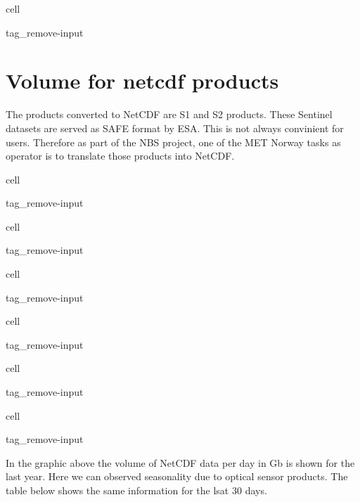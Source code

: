 \documentclass[letterpaper,10pt,english]{jupyterBook}
\begin{document}
\begin{sphinxuseclass}{cell}
\begin{sphinxuseclass}{tag_remove-input}
\end{sphinxuseclass}
\end{sphinxuseclass}

\section{Volume for netcdf products}
\label{\detokenize{volumes:volume-for-netcdf-products}}
\sphinxAtStartPar
The products converted to NetCDF are S1 and S2 products. These Sentinel datasets are served as SAFE format by ESA. This is not always convinient for users. Therefore as part of the NBS project, one of the MET Norway tasks as operator is to translate those products into NetCDF.

\begin{sphinxuseclass}{cell}
\begin{sphinxuseclass}{tag_remove-input}
\end{sphinxuseclass}
\end{sphinxuseclass}
\begin{sphinxuseclass}{cell}
\begin{sphinxuseclass}{tag_remove-input}
\end{sphinxuseclass}
\end{sphinxuseclass}
\begin{sphinxuseclass}{cell}
\begin{sphinxuseclass}{tag_remove-input}
\end{sphinxuseclass}
\end{sphinxuseclass}
\begin{sphinxuseclass}{cell}
\begin{sphinxuseclass}{tag_remove-input}
\end{sphinxuseclass}
\end{sphinxuseclass}
\begin{sphinxuseclass}{cell}
\begin{sphinxuseclass}{tag_remove-input}
\end{sphinxuseclass}
\end{sphinxuseclass}
\begin{sphinxuseclass}{cell}
\begin{sphinxuseclass}{tag_remove-input}
\end{sphinxuseclass}
\end{sphinxuseclass}
\sphinxAtStartPar
In the graphic above the volume of NetCDF data per day in Gb is shown for the last year. Here we can observed seasonality due to optical sensor products. The table below shows the same information for the lsat 30 days.
\end{document}
